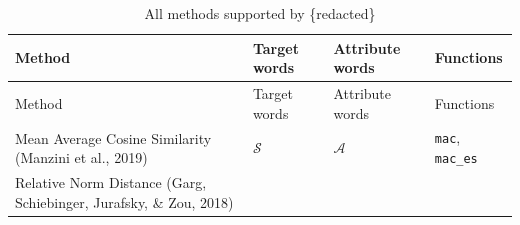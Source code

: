 \documentclass[english,man,mask]{apa6}
\begin{document}
\begin{longtable}[]{@{}llll@{}}
\caption{\label{tab:t1} All methods supported by \{redacted\}}\tabularnewline
\toprule
\begin{minipage}[b]{0.30\columnwidth}\raggedright
Method\strut
\end{minipage} & \begin{minipage}[b]{0.16\columnwidth}\raggedright
Target words\strut
\end{minipage} & \begin{minipage}[b]{0.16\columnwidth}\raggedright
Attribute words\strut
\end{minipage} & \begin{minipage}[b]{0.27\columnwidth}\raggedright
Functions\strut
\end{minipage}\tabularnewline
\midrule
\endfirsthead
\toprule
\begin{minipage}[b]{0.30\columnwidth}\raggedright
Method\strut
\end{minipage} & \begin{minipage}[b]{0.16\columnwidth}\raggedright
Target words\strut
\end{minipage} & \begin{minipage}[b]{0.16\columnwidth}\raggedright
Attribute words\strut
\end{minipage} & \begin{minipage}[b]{0.27\columnwidth}\raggedright
Functions\strut
\end{minipage}\tabularnewline
\midrule
\endhead
\begin{minipage}[t]{0.30\columnwidth}\raggedright
Mean Average Cosine Similarity (Manzini et al., 2019)\strut
\end{minipage} & \begin{minipage}[t]{0.16\columnwidth}\raggedright
\(\mathcal{S}\)\strut
\end{minipage} & \begin{minipage}[t]{0.16\columnwidth}\raggedright
\(\mathcal{A}\)\strut
\end{minipage} & \begin{minipage}[t]{0.27\columnwidth}\raggedright
\texttt{mac}, \texttt{mac\_es}\strut
\end{minipage}\tabularnewline
\begin{minipage}[t]{0.30\columnwidth}\raggedright
Relative Norm Distance (Garg, Schiebinger, Jurafsky, \& Zou, 2018)\strut
\end{minipage} & \begin{minipage}[t]{0.16\columnwidth}\raggedright

\end{minipage}
\end{longtable}
\end{document}
